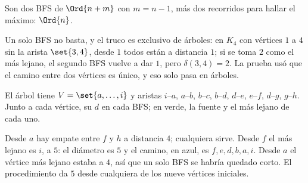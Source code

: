 \documentclass[11pt,letterpaper]{article}
\begin{document}
Son dos BFS de $\Ord{n + m}$ con $m = n - 1$, más dos recorridos para
hallar el máximo: $\Ord{n}$.

Un solo BFS no basta, y el truco es exclusivo de
árboles: en $K_4$ con vértices $1$ a $4$ sin la arista $\set{3, 4}$,
desde $1$ todos están a distancia $1$; si se toma $2$ como el más
lejano, el segundo BFS vuelve a dar $1$, pero
$\delta(3, 4) = 2$. La prueba usó que el camino entre dos vértices es
único, y eso solo pasa en árboles.

\begin{ejemplo}
  El árbol tiene $V = \set{a, \dots, i}$ y aristas $i$--$a$,
  $a$--$b$, $b$--$c$, $b$--$d$, $d$--$e$, $e$--$f$, $d$--$g$,
  $g$--$h$. Junto a cada vértice, su $d$ en cada BFS; en verde, la
  fuente y el más lejano de cada uno.
  \begin{center}
  \end{center}
  Desde $a$ hay empate entre $f$ y $h$ a distancia $4$; cualquiera
  sirve. Desde $f$ el más lejano es $i$, a $5$: el diámetro es $5$ y
  el camino, en azul, es $f, e, d, b, a, i$. Desde $a$ el vértice más
  lejano estaba a $4$, así que un solo BFS se habría quedado corto.
  El procedimiento da $5$ desde cualquiera de los nueve vértices
  iniciales.
\end{ejemplo}
\end{document}
